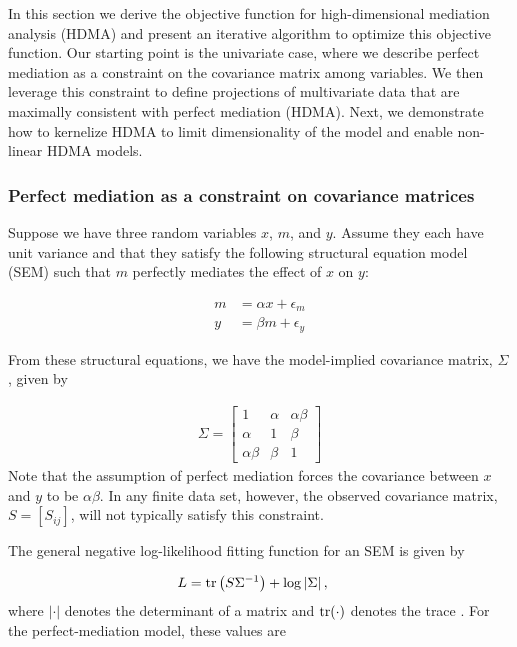 \documentclass[
]{article}
\begin{document}
In this section we derive the objective function for high-dimensional
mediation analysis (HDMA) and present an iterative algorithm to optimize
this objective function. Our starting point is the univariate case,
where we describe perfect mediation as a constraint on the covariance
matrix among variables. We then leverage this constraint to define
projections of multivariate data that are maximally consistent with
perfect mediation (HDMA). Next, we demonstrate how to kernelize HDMA to
limit dimensionality of the model and enable non-linear HDMA models.

\subsubsection{Perfect mediation as a constraint on covariance
matrices}\label{perfect-mediation-as-a-constraint-on-covariance-matrices}

Suppose we have three random variables \(x\), \(m\), and \(y\). Assume
they each have unit variance and that they satisfy the following
structural equation model (SEM) such that \(m\) perfectly mediates the
effect of \(x\) on \(y\):

\begin{align}
m &= \alpha x + \epsilon_m \label{eqn:perfect_mediation1}\\ 
y &= \beta m + \epsilon_y  \label{eqn:perfect_mediation2}
\end{align}

From these structural equations, we have the model-implied covariance
matrix, \(\Sigma\), given by

\begin{align}
\label{eqn:model_implied_covariance}
\Sigma = 
  \begin{bmatrix}
1 & \alpha & \alpha \beta \\
\alpha & 1 & \beta \\
\alpha \beta & \beta & 1
\end{bmatrix}
\end{align} Note that the assumption of perfect mediation forces the
covariance between \(x\) and \(y\) to be \(\alpha \beta\). In any finite
data set, however, the observed covariance matrix, \(S = [S_{ij}]\),
will not typically satisfy this constraint.

The general negative log-likelihood fitting function for an SEM is given
by

\begin{align}
\label{eq:loglikelihood}
L &= {\rm tr}\left(S \Sigma^{-1}\right) + \log\left|\Sigma\right|,
\end{align} where \(|\cdot|\) denotes the determinant of a matrix and
\({\rm tr}(\cdot)\) denotes the trace \cite{bollen2014structural}. For
the perfect-mediation model, these values are
\end{document}
